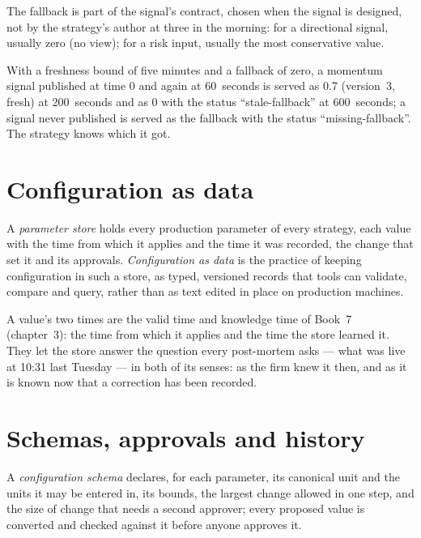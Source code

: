 The fallback is part of the signal's contract, chosen when the signal is designed, not by the strategy's author at three in the morning: for
a directional signal, usually zero (no view); for a risk input, usually the most conservative value.

\label{lst:pl:signal-serving-and-parameter-management:service}

With a freshness bound of five minutes and a fallback of zero, a momentum signal published at time 0 and again at 60~seconds is served as
0.7 (version~3, fresh) at 200~seconds and as 0 with the status ``stale-fallback'' at 600~seconds; a signal never published is served as the
fallback with the status ``missing-fallback''. The strategy knows which it got.

\section{Configuration as data}

\begin{definition}\label{def:pl:signal-serving-and-parameter-management:store}
A \emph{parameter store} holds every production parameter of every strategy, each value with the time from which it
applies and the time it was recorded, the change that set it and its approvals. \emph{Configuration as data} is
the practice of keeping configuration in such a store, as typed, versioned records that tools can validate, compare and query, rather than as
text edited in place on production machines.
\end{definition}

A value's two times are the valid time and knowledge time of Book~7 (chapter~3): the time from which it applies and the time the store learned
it. They let the store answer the question every post-mortem asks --- what was live at 10:31 last Tuesday --- in both of its senses: as the
firm knew it then, and as it is known now that a correction has been recorded.

\section{Schemas, approvals and history}

\begin{definition}\label{def:pl:signal-serving-and-parameter-management:schema}
A \emph{configuration schema} declares, for each parameter, its canonical unit and the units it may be entered
in, its bounds, the largest change allowed in one step, and the size of change that needs a second approver; every proposed value is converted
and checked against it before anyone approves it.
\end{definition}

